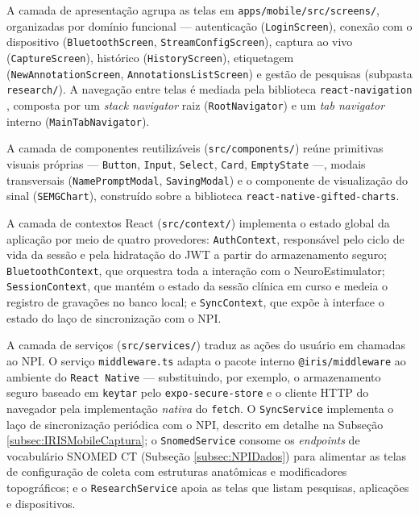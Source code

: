 A camada de apresentação agrupa as telas em \texttt{apps/mobile/src/screens/}, organizadas por domínio funcional --- autenticação (\texttt{LoginScreen}), conexão com o dispositivo (\texttt{BluetoothScreen}, \texttt{StreamConfigScreen}), captura ao vivo (\texttt{CaptureScreen}), histórico (\texttt{HistoryScreen}), etiquetagem (\texttt{NewAnnotationScreen}, \texttt{AnnotationsListScreen}) e gestão de pesquisas (subpasta \texttt{research/}). A navegação entre telas é mediada pela biblioteca \texttt{react-navigation} \cite{reactNavigationDocs}, composta por um \textit{stack navigator} raiz (\texttt{RootNavigator}) e um \textit{tab navigator} interno (\texttt{MainTabNavigator}).

A camada de componentes reutilizáveis (\texttt{src/components/}) reúne primitivas visuais próprias --- \texttt{Button}, \texttt{Input}, \texttt{Select}, \texttt{Card}, \texttt{EmptyState} ---, modais transversais (\texttt{NamePromptModal}, \texttt{SavingModal}) e o componente de visualização do sinal (\texttt{SEMGChart}), construído sobre a biblioteca \texttt{react-native-gifted-charts}. 

A camada de contextos React (\texttt{src/context/}) implementa o estado global da aplicação por meio de quatro provedores: \texttt{AuthContext}, responsável pelo ciclo de vida da sessão e pela hidratação do JWT a partir do armazenamento seguro; \texttt{BluetoothContext}, que orquestra toda a interação com o NeuroEstimulator; \texttt{SessionContext}, que mantém o estado da sessão clínica em curso e medeia o registro de gravações no banco local; e \texttt{SyncContext}, que expõe à interface o estado do laço de sincronização com o NPI.

A camada de serviços (\texttt{src/services/}) traduz as ações do usuário em chamadas ao NPI. O serviço \texttt{middleware.ts} adapta o pacote interno \texttt{@iris/middleware} ao ambiente do \texttt{React Native} --- substituindo, por exemplo, o armazenamento seguro baseado em \texttt{keytar} pelo \texttt{expo-secure-store} e o cliente HTTP do navegador pela implementação \textit{nativa} do \texttt{fetch}. O \texttt{SyncService} implementa o laço de sincronização periódica com o NPI, descrito em detalhe na Subseção \ref{subsec:IRISMobileCaptura}; o \texttt{SnomedService} consome os \textit{endpoints} de vocabulário SNOMED CT (Subseção \ref{subsec:NPIDados}) para alimentar as telas de configuração de coleta com estruturas anatômicas e modificadores topográficos; e o \texttt{ResearchService} apoia as telas que listam pesquisas, aplicações e dispositivos.

